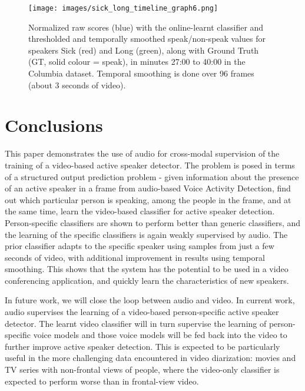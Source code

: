 \documentclass[runningheads]{llncs}
\begin{document}
\begin{figure}[t]
\begin{center}
    \texttt{[image: images/sick\_long\_timeline\_graph6.png]} 
\end{center}
\vspace*{-0.6cm} 
   \caption{Normalized raw scores (blue) with the online-learnt classifier and thresholded and temporally smoothed speak/non-speak values for speakers Sick (red) and Long (green), along with Ground Truth (GT, solid colour = speak), in minutes 27:00 to 40:00 in the Columbia dataset. Temporal smoothing is done over 96 frames (about 3 seconds of video).}
\label{fig:activeSpeakerDetectionErrors}
 \vspace*{-0.6cm} 
\end{figure}




\section{Conclusions}
\label{concl}
This paper demonstrates the use of audio for cross-modal supervision of the training of a video-based active speaker detector. The problem is posed in terms of a structured output prediction problem - given information about the presence of an active speaker in a frame from audio-based Voice Activity Detection, find out which particular person is speaking, among the people in the frame, and at the same time, learn the video-based classifier for active speaker detection. Person-specific classifiers are shown to perform better than generic classifiers, and the learning of the specific classifiers is again weakly supervised by audio. 
The prior classifier adapts to the specific speaker using samples from just a few seconds of video, with additional improvement in results using temporal smoothing. This shows that the system has the potential to be used in a video conferencing application, and quickly learn the characteristics of new speakers.

In future work, we will close the loop between audio and video. In current work, audio supervises the learning of a video-based person-specific active speaker detector. The learnt video classifier will in turn supervise the learning of person-specific voice models and those voice models will be fed back into the video to further improve active speaker detection. This is expected to be particularly useful in the more challenging data encountered in video diarization: movies and TV series with non-frontal views of people, where the video-only classifier is expected to perform worse than in frontal-view video.

\clearpage


{}
\end{document}
